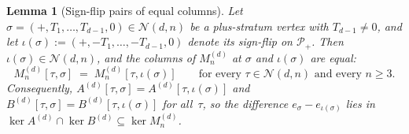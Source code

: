\documentclass{amsart}
\newtheorem{lemma}[theorem]{Lemma}
\theoremstyle{definition}
\theoremstyle{remark}
\begin{document}
\begin{lemma}[Sign-flip pairs of equal columns]
\label{lem:flip-equal-columns}
Let $\sigma = (+, T_1, \ldots, T_{d-1}, 0) \in \mathcal{N}(d, n)$
be a plus-stratum vertex with $T_{d-1} \neq 0$, and let
$\iota(\sigma) := (+, -T_1, \ldots, -T_{d-1}, 0)$ denote its
sign-flip on $\mathcal{P}_+$.  Then $\iota(\sigma) \in
\mathcal{N}(d, n)$, and the columns of $M_n^{(d)}$ at $\sigma$
and $\iota(\sigma)$ are equal:
\[
  M_n^{(d)}[\tau, \sigma] \;=\; M_n^{(d)}[\tau, \iota(\sigma)]
  \qquad \text{for every } \tau \in \mathcal{N}(d, n) \text{ and every } n \ge 3.
\]
Consequently, $A^{(d)}[\tau, \sigma] = A^{(d)}[\tau, \iota(\sigma)]$
and $B^{(d)}[\tau, \sigma] = B^{(d)}[\tau, \iota(\sigma)]$ for
all~$\tau$, so the difference $e_\sigma - e_{\iota(\sigma)}$ lies
in $\ker A^{(d)} \cap \ker B^{(d)} \subseteq \ker M_n^{(d)}$.
\end{lemma}
\end{document}
